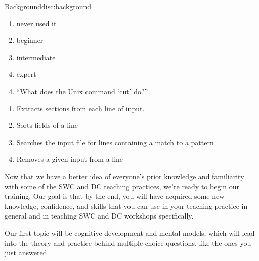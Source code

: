 \begin{discussion}{Background}{disc:background}
\begin{enumerate}
\item
  never used it
\item
  beginner
\item
  intermediate
\item
  expert
\end{enumerate}

\begin{enumerate}
\setcounter{enumi}{3}
\item
  ``What does the Unix command `cut' do?''
\end{enumerate}

\begin{enumerate}
\item
  Extracts sections from each line of input.
\item
  Sorts fields of a line
\item
  Searches the input file for lines containing a match to a pattern
\item
  Removes a given input from a line
\end{enumerate}

\end{discussion}

Now that we have a better idea of everyone's prior knowledge and
familiarity with some of the SWC and DC teaching practices, we're ready
to begin our training. Our goal is that by the end, you will have
acquired some new knowledge, confidence, and skills that you can use in
your teaching practice in general and in teaching SWC and DC workshops
specifically.

Our first topic will be cognitive development and mental models, which
will lead into the theory and practice behind multiple choice questions,
like the ones you just answered.
